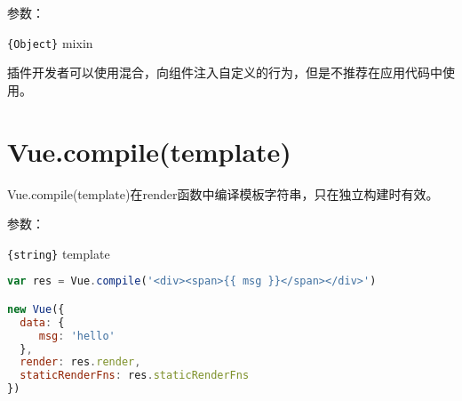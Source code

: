 参数：

\begin{compactitem}
\item \texttt{\{Object\}} mixin
\end{compactitem}

插件开发者可以使用混合，向组件注入自定义的行为，但是不推荐在应用代码中使用。


\section{Vue.compile(template)}

Vue.compile(template)在render函数中编译模板字符串，只在独立构建时有效。


参数：

\begin{compactitem}
\item \texttt{\{string\}} template
\end{compactitem}



\begin{lstlisting}[language=JavaScript]
var res = Vue.compile('<div><span>{{ msg }}</span></div>')

new Vue({
  data: {
     msg: 'hello'
  },
  render: res.render,
  staticRenderFns: res.staticRenderFns
})
\end{lstlisting}



\begin{lstlisting}[language=JavaScript]

\end{lstlisting}




\begin{lstlisting}[language=JavaScript]

\end{lstlisting}



\begin{lstlisting}[language=JavaScript]

\end{lstlisting}





\begin{lstlisting}[language=JavaScript]

\end{lstlisting}




\begin{lstlisting}[language=JavaScript]

\end{lstlisting}



